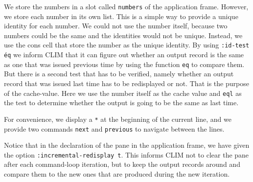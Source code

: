We store the numbers in a slot called \texttt{numbers} of the application
frame.  However, we store each number in its own list.  This is a simple
way to provide a unique identity for each number.  We could not use the
number itself, because two numbers could be the same and the identities
would not be unique.  Instead, we use the cons cell that store the
number as the unique identity.  By using \texttt{:id-test \'eq} we inform
CLIM that it can figure out whether an output record is the same as one
that was issued previous time by using the function \texttt{eq} to compare
them.  But there is a second test that has to be verified, namely
whether an output record that was issued last time has to be redisplayed
or not.  That is the purpose of the cache-value.  Here we use the number
itself as the cache value and \texttt{eql} as the test to determine whether
the output is going to be the same as last time.

For convenience, we display a \texttt{*} at the beginning of the current
line, and we provide two commands \texttt{next} and \texttt{previous} to navigate
between the lines.

Notice that in the declaration of the pane in the application frame, we
have given the option \texttt{:incremental-redisplay t}.  This informs CLIM
not to clear the pane after each command-loop iteration, but to keep the
output records around and compare them to the new ones that are produced
during the new iteration.
